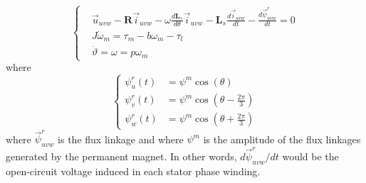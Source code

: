 \documentclass[12pt,a4paper]{scrartcl}
\begin{document}
\begin{onehalfspace}
\begin{equation}\label{threephase_eq3}
	\left\lbrace \begin{aligned}
		& \vec{u}_{uvw}-\mathbf{R}\vec{i}_{uvw}-\omega\frac{d\mathbf{L}_s}{d\theta}\vec{i}_{uvw}-\mathbf{L}_s\frac{d\vec{i}_{uvw}}{dt}-\frac{d\vec{\psi}^r_{uvw}}{dt} = 0 \\[6pt]
		& J\dot{\omega}_m = \tau_m-b{\omega}_m-\tau_l \\[6pt]
		& \dot{\vartheta} = \omega =p\omega_m
	\end{aligned} \right. 
\end{equation}
where
\begin{equation}\label{magnet_flux}
	\left\lbrace \begin{aligned}
		\psi_u^r(t) &= \psi^m\cos(\theta) \\[6pt]
		\psi_v^r(t) &= \psi^m\cos(\theta-\frac{2\pi}{3}) \\[6pt]
		\psi_w^r(t) &= \psi^m\cos(\theta+\frac{2\pi}{3})
	\end{aligned} \right. 
\end{equation}
where $\vec{\psi}^r_{uvw}$ is the flux linkage and where $\psi^m$ is the amplitude of the flux linkages generated by the permanent magnet. In other words, $d\vec{\psi}^r_{uvw}/dt$ would be the open-circuit voltage induced in each stator phase winding. 


\end{onehalfspace}
\end{document}
